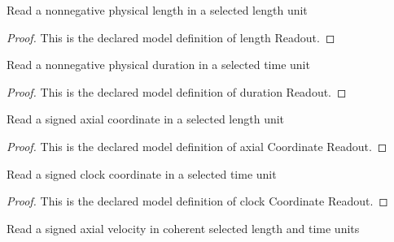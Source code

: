 \begin{definition}
  \label{def:physics:phyx-mini-0529:phyxminiproblems-problemphyxmini0529-lengthreadout}
  Read a nonnegative physical length in a selected length unit
\end{definition}
\begin{proof}
  This is the declared model definition of length Readout.
\end{proof}
\begin{definition}
  \label{def:physics:phyx-mini-0529:phyxminiproblems-problemphyxmini0529-durationreadout}
  Read a nonnegative physical duration in a selected time unit
\end{definition}
\begin{proof}
  This is the declared model definition of duration Readout.
\end{proof}
\begin{definition}
  \label{def:physics:phyx-mini-0529:phyxminiproblems-problemphyxmini0529-axialcoordinatereadout}
  Read a signed axial coordinate in a selected length unit
\end{definition}
\begin{proof}
  This is the declared model definition of axial Coordinate Readout.
\end{proof}
\begin{definition}
  \label{def:physics:phyx-mini-0529:phyxminiproblems-problemphyxmini0529-clockcoordinatereadout}
  Read a signed clock coordinate in a selected time unit
\end{definition}
\begin{proof}
  This is the declared model definition of clock Coordinate Readout.
\end{proof}
\begin{definition}
  \label{def:physics:phyx-mini-0529:phyxminiproblems-problemphyxmini0529-axialvelocityreadout}
  Read a signed axial velocity in coherent selected length and time units
\end{definition}
